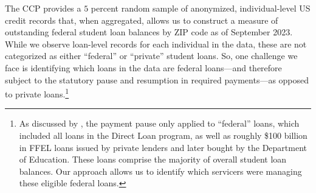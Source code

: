 \documentclass[12pt]{article}
\begin{document}
The CCP provides a $5$ percent random sample of anonymized, individual-level US credit records that, when aggregated, allows us to construct a measure of outstanding federal student loan balances by ZIP code as of September 2023.  While we observe loan-level records for each individual in the data, these are not categorized as either ``federal'' or ``private'' student loans. So, one challenge we face is identifying which loans in the data are federal loans---and therefore subject to the statutory pause and resumption in required payments---as opposed to private loans.\footnote{As discussed by \cite{dinerstein2024debt}, the payment pause only applied to ``federal'' loans, which included all loans in the Direct Loan program, as well as roughly \$100 billion in FFEL loans issued by private lenders and later bought by the Department of Education. These loans comprise the majority of overall student loan balances. Our approach allows us to identify which servicers were managing these eligible federal loans.}
\end{document}
